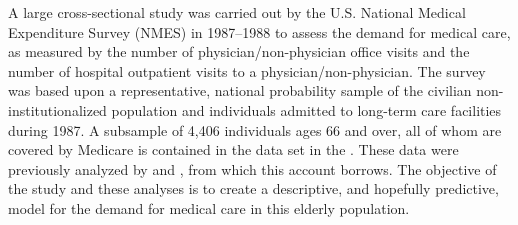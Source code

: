 \documentclass[11pt]{book}\usepackage[]{graphicx}\usepackage[]{color}
\begin{document}
A large cross-sectional study was carried out by the U.S. National Medical Expenditure
Survey (NMES) in 1987--1988 to assess the demand for medical care, as
measured by the number of physician/non-physician office visits and the
number of hospital outpatient visits to a physician/non-physician. 
The survey was based upon a representative, national probability sample of the civilian non-institutionalized population and individuals admitted to long-term care facilities during 1987.  A subsample of 4,406
individuals ages 66 and over, all of whom are covered by Medicare is contained
in the  data set in the .
These data were previously analyzed by \citet{DebTrivedi:1997}
and \citet{Zeileis-etal:2008}, from which this account borrows.
The objective of the study and these analyses is to create a descriptive, and hopefully predictive, model
for the demand for medical care in this elderly population.
\end{document}
